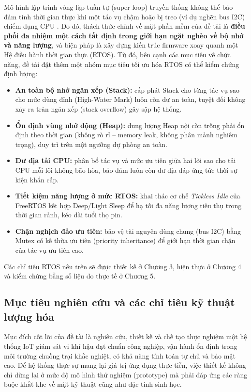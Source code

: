 Mô hình lập trình vòng lặp tuần tự (super-loop) truyền thống không thể bảo đảm tính thời gian thực khi một tác vụ chậm hoặc bị treo (ví dụ nghẽn bus I2C) chiếm dụng CPU \cite{white2011making}. Do đó, thách thức chính về mặt phần mềm của đề tài là \textbf{điều phối đa nhiệm một cách tất định trong giới hạn ngặt nghèo về bộ nhớ và năng lượng}, và biện pháp là xây dựng kiến trúc firmware xoay quanh một Hệ điều hành thời gian thực (RTOS). Từ đó, bên cạnh các mục tiêu về chức năng, đề tài đặt thêm một nhóm mục tiêu tối ưu hóa RTOS có thể kiểm chứng định lượng:
\begin{itemize}
    \item \textbf{An toàn bộ nhớ ngăn xếp (Stack):} cấp phát Stack cho từng tác vụ sao cho mức dùng đỉnh (High-Water Mark) luôn còn dư an toàn, tuyệt đối không xảy ra tràn ngăn xếp (stack overflow) gây sập hệ thống.
    \item \textbf{Ổn định vùng nhớ động (Heap):} dung lượng Heap nội còn trống phải ổn định theo thời gian (không rò rỉ -- memory leak, không phân mảnh nghiêm trọng), duy trì trên một ngưỡng dự phòng an toàn.
    \item \textbf{Dư địa tải CPU:} phân bổ tác vụ và mức ưu tiên giữa hai lõi sao cho tải CPU mỗi lõi không bão hòa, bảo đảm luôn còn dư địa đáp ứng tức thời sự kiện khẩn cấp.
    \item \textbf{Tiết kiệm năng lượng ở mức RTOS:} khai thác cơ chế \textit{Tickless Idle} của FreeRTOS kết hợp Deep/Light Sleep để hạ tối đa năng lượng tiêu thụ trong thời gian rảnh, kéo dài tuổi thọ pin.
    \item \textbf{Chặn nghịch đảo ưu tiên:} bảo vệ tài nguyên dùng chung (bus I2C) bằng Mutex có kế thừa ưu tiên (priority inheritance) để giới hạn thời gian chặn của tác vụ ưu tiên cao.
\end{itemize}
Các chỉ tiêu RTOS nêu trên sẽ được thiết kế ở Chương 3, hiện thực ở Chương 4 và kiểm chứng bằng số liệu đo thực tế ở Chương 5.

\subsection{Mục tiêu nghiên cứu và các chỉ tiêu kỹ thuật lượng hóa}
Mục đích cốt lõi của đề tài là nghiên cứu, thiết kế và chế tạo thực nghiệm một hệ thống IoT giám sát vi khí hậu đạt chuẩn công nghiệp, vận hành ổn định trong môi trường chuồng trại khắc nghiệt, có khả năng tính toán tự chủ và bảo mật cao. Để hệ thống thực sự mang lại giá trị ứng dụng thực tiễn, việc thiết kế không chỉ dừng lại ở mức độ mô hình thử nghiệm (prototype) mà phải đáp ứng các ràng buộc khắt khe về mặt kỹ thuật cũng như đặc tính sinh học.

